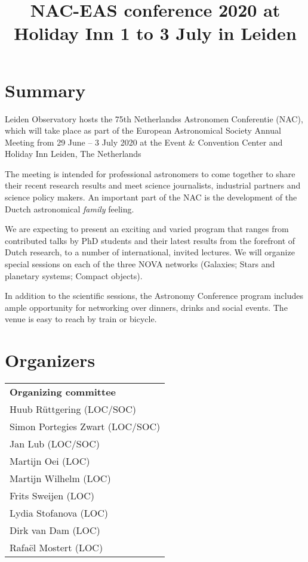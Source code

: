 \documentclass{article}
\title{NAC-EAS conference 2020 at Holiday Inn 1 to 3 July in Leiden}
\begin{document}
\maketitle

\section{Summary}

Leiden Observatory hosts the 75th Netherlandss Astronomen Conferentie
(NAC), which will take place as part of the European Astronomical
Society Annual Meeting from 29 June – 3 July 2020 at the Event
\& Convention Center and Holiday Inn Leiden, The Netherlands

The meeting is intended for professional astronomers to come together
to share their recent research results and meet science journalists,
industrial partners and science policy makers. An important part of
the NAC is the development of the Ductch astronomical {\em family}
feeling.

We are expecting to present an exciting and varied program that ranges
from contributed talks by PhD students and their latest results from
the forefront of Dutch research, to a number of international, invited
lectures. We will organize special sessions on each of the three NOVA
networks (Galaxies; Stars and planetary systems; Compact objects).

In addition to the scientific sessions, the Astronomy Conference
program includes ample opportunity for networking over dinners, drinks
and social events. The venue is easy to reach by train or bicycle.

\section{Organizers}

    \begin{tabular}{l}
        \textbf{Organizing committee}\\
        Huub R\"uttgering (LOC/SOC)\\
        Simon Portegies Zwart (LOC/SOC)\\
        Jan Lub (LOC/SOC) \\
        Martijn Oei  (LOC) \\         
        Martijn Wilhelm (LOC) \\         
        Frits Sweijen          (LOC) \\         
        Lydia Stofanova (LOC) \\         
        Dirk van Dam  (LOC) \\         
        Rafa\"el Mostert  (LOC) \\         
    \end{tabular}
\end{document}

